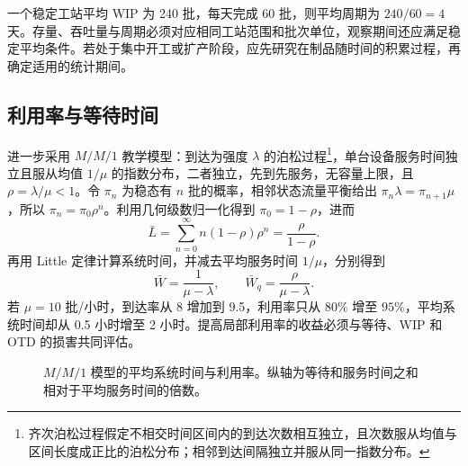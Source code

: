 一个稳定工站平均 WIP 为 240 批，每天完成 60 批，则平均周期为 \(240/60=4\) 天。存量、吞吐量与周期必须对应相同工站范围和批次单位，观察期间还应满足稳定平均条件。若处于集中开工或扩产阶段，应先研究在制品随时间的积累过程，再确定适用的统计期间。

\subsection{利用率与等待时间}
进一步采用 \(M/M/1\) 教学模型：到达为强度 \(\lambda\) 的泊松过程\footnote{齐次泊松过程假定不相交时间区间内的到达次数相互独立，且次数服从均值与区间长度成正比的泊松分布；相邻到达间隔独立并服从同一指数分布。}，单台设备服务时间独立且服从均值 \(1/\mu\) 的指数分布，二者独立，先到先服务，无容量上限，且 \(\rho=\lambda/\mu<1\)。令 \(\pi_n\) 为稳态有 \(n\) 批的概率，相邻状态流量平衡给出 \(\pi_n\lambda=\pi_{n+1}\mu\)，所以 \(\pi_n=\pi_0\rho^n\)。利用几何级数归一化得到 \(\pi_0=1-\rho\)，进而
\[
\bar L=\sum_{n=0}^\infty n(1-\rho)\rho^n
=\frac{\rho}{1-\rho}.
\]
再用 Little 定律计算系统时间，并减去平均服务时间 \(1/\mu\)，分别得到
\[
\bar W=\frac1{\mu-\lambda},\qquad
\bar W_q=\frac{\rho}{\mu-\lambda}.
\]
若 \(\mu=10\) 批/小时，到达率从 8 增加到 9.5，利用率只从 \(80\%\) 增至 \(95\%\)，平均系统时间却从 0.5 小时增至 2 小时。提高局部利用率的收益必须与等待、WIP 和 OTD 的损害共同评估。

\begin{figure}[htbp]
\centering
{}
\caption{\(M/M/1\) 模型的平均系统时间与利用率。纵轴为等待和服务时间之和相对于平均服务时间的倍数。}
\end{figure}

